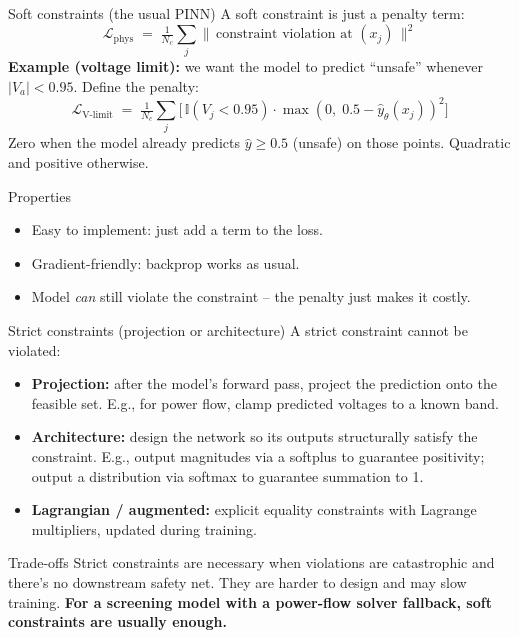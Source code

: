 \documentclass[aspectratio=169,10pt]{beamer}
\begin{document}
\begin{frame}{Soft constraints (the usual PINN)}
A soft constraint is just a penalty term:
\begin{equation*}
\mathcal{L}_{\text{phys}} \;=\; \tfrac{1}{N_c} \sum_j \|\, \text{constraint violation at }(x_j) \,\|^2
\end{equation*}
\vspace{0.2em}
\textbf{Example (voltage limit):} we want the model to predict ``unsafe'' whenever $|V_a| < 0.95$. Define the penalty:
\begin{equation*}
\mathcal{L}_{\text{V-limit}} \;=\; \tfrac{1}{N_c} \sum_j \bigl[\, \mathbb{I}(V_j < 0.95) \cdot \max(0, \; 0.5 - \hat{y}_\theta(x_j))^2 \bigr]
\end{equation*}
Zero when the model already predicts $\hat{y} \geq 0.5$ (unsafe) on those points. Quadratic and positive otherwise.
\vspace{0.4em}
\begin{block}{Properties}
\begin{itemize}
  \item Easy to implement: just add a term to the loss.
  \item Gradient-friendly: backprop works as usual.
  \item Model \emph{can} still violate the constraint -- the penalty just makes it costly.
\end{itemize}
\end{block}
\end{frame}

\begin{frame}{Strict constraints (projection or architecture)}
A strict constraint cannot be violated:
\begin{itemize}
  \item \textbf{Projection:} after the model's forward pass, project the prediction onto the feasible set. E.g., for power flow, clamp predicted voltages to a known band.
  \item \textbf{Architecture:} design the network so its outputs structurally satisfy the constraint. E.g., output magnitudes via a softplus to guarantee positivity; output a distribution via softmax to guarantee summation to 1.
  \item \textbf{Lagrangian / augmented:} explicit equality constraints with Lagrange multipliers, updated during training.
\end{itemize}
\vspace{0.5em}
\begin{block}{Trade-offs}
Strict constraints are necessary when violations are catastrophic and there's no downstream safety net. They are harder to design and may slow training. \textbf{For a screening model with a power-flow solver fallback, soft constraints are usually enough.}
\end{block}
\end{frame}
\end{document}
